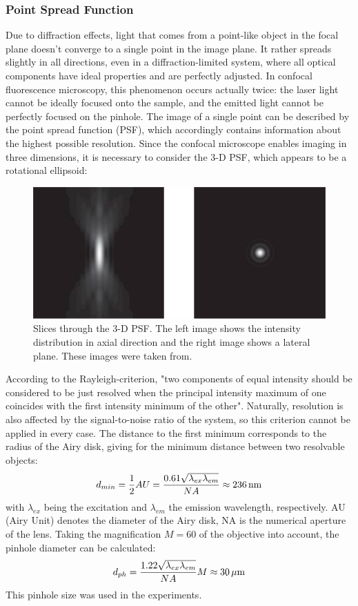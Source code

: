 \documentclass[12pt,a4paper]{article}
\begin{document}
\subsubsection{Point Spread Function}
Due to diffraction effects, light that comes from a point-like object in the focal plane doesn't converge to a single point in the image plane. It rather spreads slightly in all directions, even in a diffraction-limited system, where all optical components have ideal properties and are perfectly adjusted. In confocal fluorescence microscopy, this phenomenon occurs actually twice: the laser light cannot be ideally focused onto the sample, and the emitted light cannot be perfectly focused on the pinhole. The image of a single point can be described by the point spread function (PSF), which accordingly contains information about the highest possible resolution. Since the confocal microscope enables imaging in three dimensions, it is necessary to consider the 3-D PSF, which appears to be a rotational ellipsoid:
\begin{figure}[H]
\centering
\includegraphics[scale=0.5]{PSF.png} 
\caption{Slices through the 3-D PSF. The left image shows the intensity distribution in axial direction and the right image shows a lateral plane. These images were taken from\cite{czj}.}
\label{psf}
\end{figure}
According to the Rayleigh-criterion, "two components of equal intensity should be considered to be just resolved when the principal intensity maximum of one coincides with the first intensity minimum of the other"\cite{poo}. Naturally, resolution is also affected by the signal-to-noise ratio of the system\cite{cfm}, so this criterion cannot be applied in every case. The distance to the first minimum corresponds to the radius of the Airy disk, giving for the minimum distance between two resolvable objects:
\begin{equation}
d_{min}=\frac{1}{2}AU=\frac{0.61\sqrt{\lambda_{ex}\lambda_{em}}}{NA}\approx\unit[236]{nm}
\end{equation}
with $\lambda_{ex}$ being the excitation and $\lambda_{em}$ the emission wavelength, respectively. AU (Airy Unit) denotes the diameter of the Airy disk, NA is the numerical aperture of the lens. 
Taking the magnification $M=60$ of the objective into account, the pinhole diameter can be calculated:
\begin{equation}
d_{ph}=\frac{1.22\sqrt{\lambda_{ex}\lambda_{em}}}{NA}M\approx\unit[30]{\mu m}
\end{equation}
This pinhole size was used in the experiments.
\end{document}
